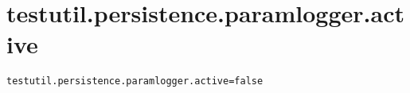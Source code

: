 \section{testutil.persistence.paramlogger.active}
\label{configuration:TestutilPersistenceParamloggerActive}
\AvailableInJavaOnly{\TODO}
\begin{lstlisting}[style=Props,caption={Usage example for \textit{testutil.persistence.paramlogger.active}}]
testutil.persistence.paramlogger.active=false
\end{lstlisting}